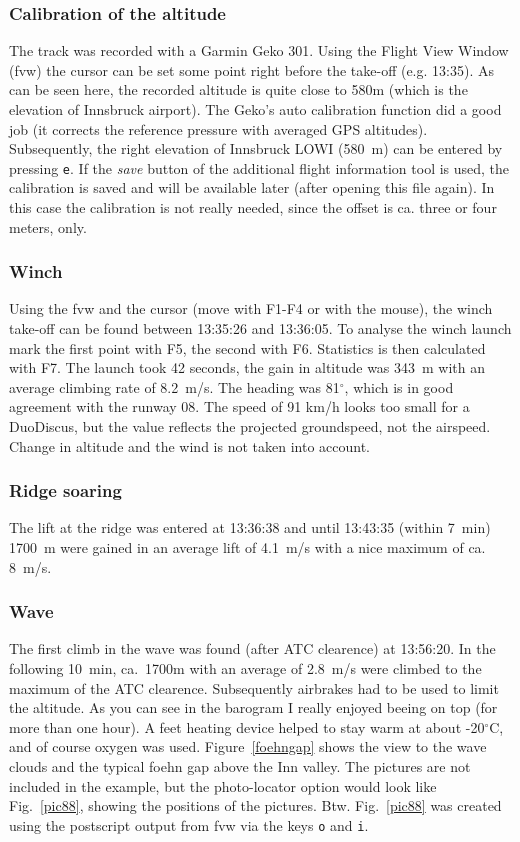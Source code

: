 \subsubsection{Calibration of the altitude}
The track was recorded with a Garmin Geko 301.
Using the Flight View Window (fvw) the cursor can be set some point right before the take-off (e.g. 13:35).
As can be seen here, the recorded altitude is quite close to 580m (which is the elevation of Innsbruck airport). The Geko's
auto calibration function did a good job (it corrects the reference pressure with averaged GPS altitudes).
Subsequently, the right elevation of Innsbruck LOWI (580~m) can be entered by pressing \texttt{e}. If the \emph{save} button of the additional flight information tool is used, the calibration is saved and will be available later (after opening this file again). In this case the calibration is not really needed, since the offset is ca. three or four meters, only.

\subsubsection{Winch}
Using the fvw and the cursor (move with F1-F4 or with the mouse), the winch take-off can be found between 13:35:26 and 13:36:05. To analyse the winch launch mark the first point with F5, the second with F6. Statistics is then calculated with F7.
The launch took 42 seconds, the gain in altitude was 343~m with an average climbing rate of 8.2~m/s. The heading was 81$^\circ$, which is in good agreement with the runway 08. The speed of 91 km/h looks too small for a DuoDiscus, but the value reflects the projected groundspeed, not the airspeed. Change in altitude and the wind is not taken into account.

\subsubsection{Ridge soaring}
The lift at the ridge was entered at 13:36:38 and until 13:43:35 (within 7~min) 1700~m were gained in an average lift of 4.1~m/s with a nice maximum of ca. 8~m/s.

\subsubsection{Wave}
The first climb in the wave was found (after ATC clearence) at 13:56:20. In the following 10~min, ca.~1700m with an average of 2.8~m/s were climbed to the maximum of the ATC clearence. Subsequently airbrakes had to be used to limit the altitude.
As you can see in the barogram I really enjoyed beeing on top (for more than one hour). A feet heating device helped to stay warm at about -20$^\circ$C, and of course oxygen was used. Figure~\ref{foehngap} shows the view to the wave clouds and the typical foehn gap above the Inn valley.
The pictures are not included in the example, but the photo-locator option would look like Fig.~\ref{pic88}, showing the positions of the pictures. Btw. Fig.~\ref{pic88} was created using the postscript output from fvw via the keys \texttt{o} and \texttt{i}.

